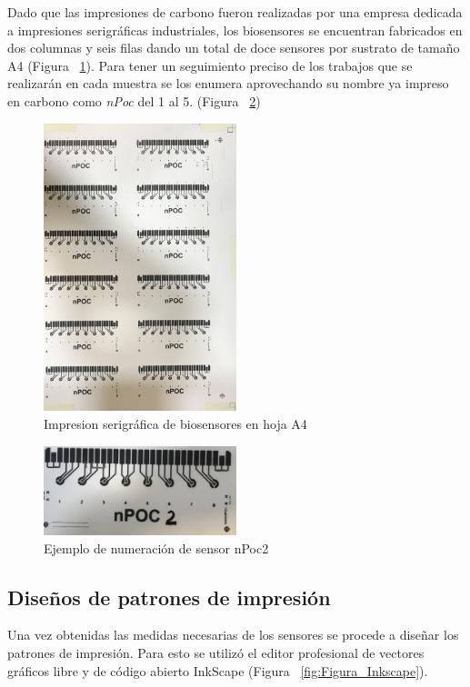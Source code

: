 Dado que las impresiones de carbono fueron realizadas por una empresa dedicada a impresiones serigráficas industriales, los biosensores se encuentran fabricados en dos columnas y seis filas dando un total de doce sensores por sustrato de tamaño A4 (Figura ~\ref{fig:Figura_sensores_hoja_A4}). Para tener un seguimiento preciso de los trabajos que se realizarán en cada muestra se los enumera aprovechando su nombre ya impreso en carbono como \textit{nPoc} del 1 al 5. (Figura ~\ref{fig:Figura_ejemplo_numeracion_nPoc})

\begin{figure}[H]
  \centering
    \includegraphics[width=0.5\textwidth]{Figuras/Figura_sensores_hoja_A4}
  \caption{Impresion serigráfica de biosensores en hoja A4}
  \label{fig:Figura_sensores_hoja_A4}
\end{figure}

\begin{figure}[H]
  \centering
    \includegraphics[width=0.5\textwidth]{Figuras/Figura_ejemplo_numeracion_nPoc}
  \caption{Ejemplo de numeración de sensor nPoc2}
  \label{fig:Figura_ejemplo_numeracion_nPoc}
\end{figure}

\subsection{Diseños de patrones de impresión}\label{subsec:diseno_impresion}
Una vez obtenidas las medidas necesarias de los sensores se procede a diseñar los patrones de impresión. Para esto se utilizó el editor profesional de vectores gráficos libre y de código abierto InkScape \cite{Inkscape} (Figura ~\ref{fig:Figura_Inkscape}).

